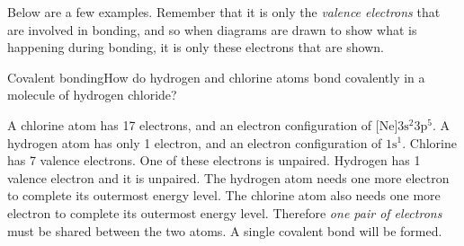 \label{m38704*id138991}Below are a few examples. Remember that it is only the \textsl{valence electrons} that are involved in bonding, and so when diagrams are drawn to show what is happening during bonding, it is only these electrons that are shown. \par 
\label{m38704*secfhsst!!!underscore!!!id98} 
\begin{wex}{Covalent bonding}{How do hydrogen and chlorine atoms bond covalently in a molecule of hydrogen chloride?}{
A chlorine atom has 17 electrons, and an electron configuration of $\text{[Ne]}3\text{s}^{2}3\text{p}^{5}$. A hydrogen atom has only 1 electron, and an electron configuration of $1\text{s}^{1}$.
Chlorine has 7 valence electrons. One of these electrons is unpaired. Hydrogen has 1 valence electron and it is unpaired.
The hydrogen atom needs one more electron to complete its outermost energy level. The chlorine atom also needs one more electron to complete its outermost energy level. Therefore \textit{one pair of electrons} must be shared between the two atoms. A single covalent bond will be formed.
\begin{figure}[H]
\begin{center}
\end{center}
\label{fig:bonding:hydrogen chloride}
\end{figure}
}
\end{wex}
